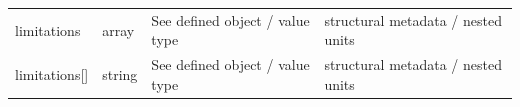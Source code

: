 \begin{longtable}{@{}>{\raggedright\arraybackslash}p{}>{\raggedright\arraybackslash}p{}>{\raggedright\arraybackslash}p{}>{\raggedright\arraybackslash}p{}@{}}
limitations & array & See defined object /\allowbreak{} value type & structural metadata /\allowbreak{} nested units\\
limitations[] & string & See defined object /\allowbreak{} value type & structural metadata /\allowbreak{} nested units\\
\end{longtable}\endgroup
